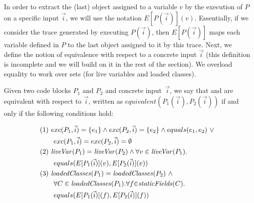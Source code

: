 \documentclass[sigconf,review,anonymous]{acmart}
\begin{document}
In order to extract the (last) object assigned to a variable $v$ by the execution of $P$ on a specific input $\vec{i}$,
we will use the notation $E[P(\vec{i})](v)$. Essentially, if we consider the trace generated by executing $P(\vec{i})$,
then $E[P(\vec{i})]$ maps each variable defined in $P$ to the last object assigned to it by this trace.
Next, we define the notion of equivalence with respect to a concrete input $\vec{i}$ (this definition is incomplete and we will build on it in the rest of the section).
We overload equality to work over sets (for live variables and loaded classes).

\begin{definition}\label{def:prog-equiv}
  Given two code blocks $P_1$ and $P_2$ and concrete input~$\vec{i}$,
  we say that  and  are equivalent
  with respect to $\vec{i}$, written as $equivalent(P_1(\vec{i}), P_2(\vec{i}))$
  if and only if the following conditions hold:
%


\[
\begin{aligned}
  & (1)~ exc(P_1, \vec{i})=\{e_1\} \wedge exc(P_2, \vec{i})=\{e_2\} \wedge equals(e_1,e_2) ~\vee\\
  & \qquad exc(P_1, \vec{i})=exc(P_2, \vec{i}) =\emptyset \\ 
      & (2)~ \mathit{{liveVar}}(P_1) = \mathit{{liveVar}}(P_2) \wedge \forall v\in \mathit{{liveVar}}(P_1). \\
      & \qquad equals(E[P_1(\vec{i})](v), E[P_2(\vec{i})](v))\\
  & (3)~  \mathit{{loadedClasses}}(P_1) = \mathit{{loadedClasses}}(P_2) ~\wedge\\
  & \qquad \forall C \in \mathit{{loadedClasses}}(P_1). \forall f {\in} \mathit{{staticFields}}(C).\\
  & \qquad equals(E[P_1(\vec{i})](f), E[P_2(\vec{i})](f))
    \end{aligned}
    \]

 
  \end{definition}
\end{document}
